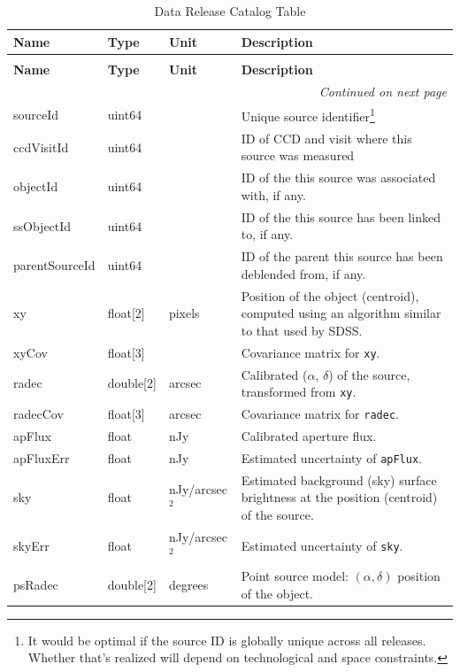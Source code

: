 \documentclass[SE,lsstdraft,toc]{lsstdoc}
\newenvironment{schema}[3]{%
\setlength\LTleft{0pt}
\setlength\LTright{\fill}
\begin{longtable}{p{0.2\textwidth}p{0.14\textwidth}p{0.14\textwidth}p{0.41\textwidth}}

\caption[#1]{#2\label{#3}}\\

\hline \textbf{Name} & \textbf{Type} & \textbf{Unit} & \textbf{Description}\\ \hline
\endfirsthead

\caption[#1]{#2}\\

\hline \textbf{Name} & \textbf{Type} & \textbf{Unit} & \textbf{Description}\\ \hline
\endhead

\hline \multicolumn{4}{r}{\emph{Continued on next page}} \\
\endfoot

\hline\hline
\endlastfoot
}{%
\hline
\end{longtable}
}
\begin{document}
\begin{schema}{\Source Table}{Data Release Catalog \Source Table}{tbl:sourceTable}

sourceId & uint64 & ~ & Unique source identifier\footnote{It would be optimal if the source ID is globally unique across all releases. Whether that's realized will depend on technological and space constraints.} \\

ccdVisitId & uint64 & ~ & ID of CCD and visit where this source was measured \\

objectId & uint64 & ~ & ID of the \Object this source was associated with, if any. \\

ssObjectId & uint64 & ~ & ID of the \SSObject this source has been linked to, if any. \\

parentSourceId & uint64 & ~ & ID of the parent \Source this source has been deblended from, if any. \\

xy & float[2] & pixels & Position of the object (centroid), computed using an algorithm similar to that used by SDSS.\\

xyCov & float[3] & ~ & Covariance matrix for \texttt{xy}. \\

radec & double[2] & arcsec & Calibrated ($\alpha$, $\delta$) of the source, transformed from \texttt{xy}.\\

radecCov & float[3] & arcsec & Covariance matrix for \texttt{radec}. \\

apFlux & float & nJy & Calibrated aperture flux. \\

apFluxErr & float & nJy &  Estimated uncertainty of \texttt{apFlux}. \\

sky & float & nJy/arcsec$^{2}$ & Estimated background (sky) surface brightness at the position (centroid) of the source. \\

skyErr & float & nJy/arcsec$^{2}$ & Estimated uncertainty of \texttt{sky}. \\

psRadec & double[2] & degrees & Point source model: $(\alpha, \delta)$ position of the object. \\


\end{schema}
\end{document}
